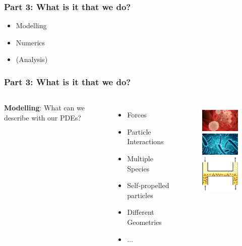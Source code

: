 \documentclass[aspectratio=169,xcolor=dvipsnames]{beamer}
\begin{document}
\begin{frame}
	\frametitle{Part 3: What is it that we do?}
	
	\begin{itemize}
		\item Modelling
		\item Numerics
		\item (Analysis)
	\end{itemize}
	
\end{frame}
\begin{frame}
	\frametitle{Part 3: What is it that we do?}
	\begin{columns}
	\textbf{Modelling}: What can we describe with our PDEs?
	\begin{itemize}
		\item Forces
		\item Particle Interactions
		\item Multiple Species
		\item Self-propelled particles
		\item Different Geometries
		\item ...
	\end{itemize}
       		\begin{figure}
       	\includegraphics[width=3cm]{bloodcells.jpg}\\
       	\includegraphics[width=3cm]{bacteria.png}\\
       	\includegraphics[width=3cm]{Microfilter.png}
       \end{figure}
    \end{columns}
\end{frame}
\end{document}
